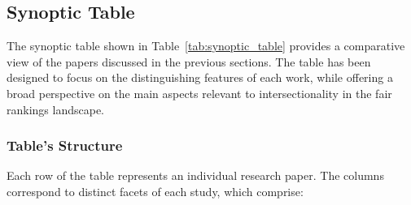 


\subsection{Synoptic Table}
\label{sec:intrank_table}
The synoptic table shown in Table~\ref{tab:synoptic_table} provides a comparative view of the papers discussed in the previous sections.
The table has been designed to focus on the distinguishing features of each work, while offering a broad perspective on the main aspects relevant to intersectionality in the fair rankings landscape.


\subsubsection{Table's Structure}
\label{subsec:intrank_table_struct}


Each row of the table represents an individual research paper. The columns correspond to distinct facets of each study, which comprise:

